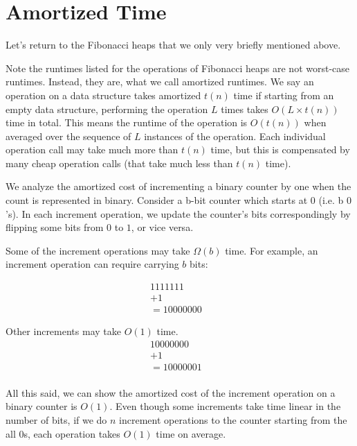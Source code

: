 \documentclass [12pt]{article}
\theoremstyle{definition}
\begin{document}
\section{Amortized Time}
Let's return to the Fibonacci heaps that we only very briefly mentioned above.
 
Note the runtimes listed for the operations of Fibonacci heaps are not worst-case runtimes. Instead, they are, what we call amortized runtimes. We say an operation on a data structure takes amortized $t(n)$ time if starting from an empty data structure, performing the operation
$L$ times takes $O(L \times t(n))$ time in total. This means the runtime of the operation is $O(t(n))$ when averaged over the sequence of $L$ instances of the operation. Each individual operation call may take much more than $t(n)$ time, but this is compensated by many cheap operation calls (that take much less than $t(n)$ time).
 
We analyze the amortized cost of incrementing a binary counter by one when the count is represented in binary. Consider a b-bit counter which starts at $0$ (i.e. b $0$'s). In each increment operation, we update the counter's bits correspondingly by flipping some bits from $0$ to $1$, or vice versa.

Some of the increment operations may take $\Omega(b)$ time. For example, an increment operation can require carrying $b$ bits:

\begin{align*}
1111111& \\
+ 1& \\
= 10000000&
\end{align*}

Other increments may take $O(1)$ time. 
\begin{align*}
10000000& \\
+ 1& \\
=10000001& \\
\end{align*}
 
All this said, we can show the amortized cost of the increment operation on a binary counter is $O(1)$. Even though some increments take time linear in the number of bits, if we do $n$ increment operations to the counter starting from the all $0$s, each operation takes $O(1)$ time on average.
\end{document}
